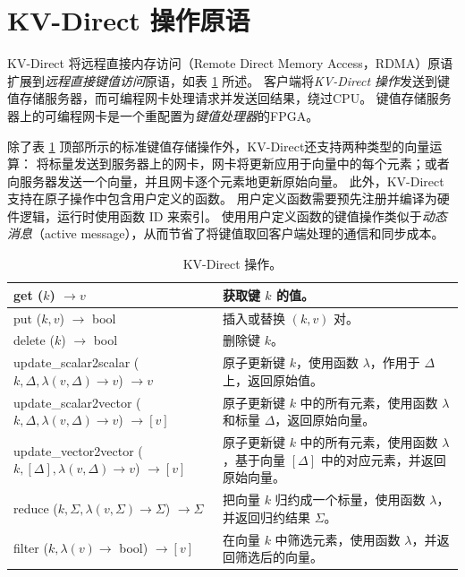 \section{KV-Direct 操作原语}
\label{kvdirect:sec:architecture}
\label{kvdirect:sec:kv-operations}

KV-Direct 将远程直接内存访问（Remote Direct Memory Access，RDMA）原语扩展到\textit {远程直接键值访问}原语，如表 \ref {kvdirect:tab:kv-operations} 所述。
客户端将\textit {KV-Direct 操作}发送到键值存储服务器，而可编程网卡处理请求并发送回结果，绕过CPU。
键值存储服务器上的可编程网卡是一个重配置为\textit {键值处理器}的FPGA。

除了表 \ref {kvdirect:tab:kv-operations} 顶部所示的标准键值存储操作外，KV-Direct还支持两种类型的向量运算：
将标量发送到服务器上的网卡，网卡将更新应用于向量中的每个元素；或者向服务器发送一个向量，并且网卡逐个元素地更新原始向量。
此外，KV-Direct 支持在原子操作中包含用户定义的函数。
用户定义函数需要预先注册并编译为硬件逻辑，运行时使用函数 ID 来索引。
使用用户定义函数的键值操作类似于\textit {动态消息}（active message）\cite {eicken1992active}，从而节省了将键值取回客户端处理的通信和同步成本。


\begin{table}
\centering
\caption{KV-Direct 操作。}
\label{kvdirect:tab:kv-operations}
\small
\begin{tabular}{p{}|p{} }
\toprule
get ($k$) $\rightarrow v$ & 获取键 $k$ 的值。 \\
\midrule
put ($k, v$) $\rightarrow$ bool & 插入或替换 $(k, v)$ 对。 \\
\midrule
delete ($k$) $\rightarrow$ bool & 删除键 $k$。 \\
\midrule
\midrule
update{\_}scalar2scalar ($k, \Delta, \lambda(v, \Delta) \rightarrow v$) $\rightarrow v$ & 原子更新键 $k$，使用函数 $\lambda$，作用于 $\Delta$ 上，返回原始值。\\
\midrule
update{\_}scalar2vector ($k, \Delta, \lambda(v, \Delta) \rightarrow v$) $\rightarrow [v]$ & 原子更新键 $k$ 中的所有元素，使用函数 $\lambda$ 和标量 $\Delta$，返回原始向量。 \\
\midrule
update{\_}vector2vector ($k, [\Delta], \lambda(v, \Delta) \rightarrow v$) $\rightarrow [v]$ & 原子更新键 $k$ 中的所有元素，使用函数 $\lambda$，基于向量 $[\Delta]$ 中的对应元素，并返回原始向量。 \\
\midrule
reduce ($k, \Sigma, \lambda(v, \Sigma) \rightarrow \Sigma$) $\rightarrow \Sigma$ & 把向量 $k$ 归约成一个标量，使用函数 $\lambda$，并返回归约结果 $\Sigma$。 \\
\midrule
filter ($k, \lambda(v) \rightarrow$ bool) $\rightarrow [v]$ & 在向量 $k$ 中筛选元素，使用函数 $\lambda$，并返回筛选后的向量。 \\
\bottomrule
\end{tabular}
\end{table}


